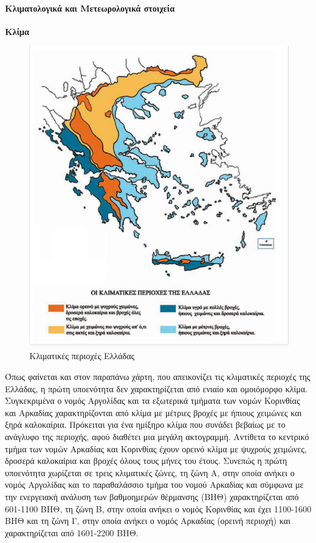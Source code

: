 \documentclass[12pt]{article}
\begin{document}
	\paragraph{Κλιματολογικά και Μετεωρολογικά στοιχεία}
	
	\textbf{Κλίμα}
	
	\begin{figure} [H]
		\begin{center}
			\includegraphics [scale = 0.70] {klima2.png}
			\caption{Κλιματικές περιοχές Ελλάδας}
			\label{klimatikes}
		\end{center}
	\end{figure}
	
	Όπως φαίνεται και στον παραπάνω χάρτη, που απεικονίζει τις κλιματικές περιοχές της Ελλάδας, η πρώτη υποενότητα δεν χαρακτηρίζεται από ενιαίο και ομοιόμορφο κλίμα. Συγκεκριμένα ο νομός Αργολίδας και τα εξωτερικά τμήματα των νομών Κορινθίας και Αρκαδίας χαρακτηρίζονται από κλίμα με μέτριες βροχές με ήπιους χειμώνες και ξηρά καλοκαίρια. Πρόκειται για ένα ημίξηρο κλίμα που συνάδει βεβαίως με το ανάγλυφο της περιοχής, αφού διαθέτει μια μεγάλη ακτογραμμή. Αντίθετα το κεντρικό τμήμα των νομών Αρκαδίας και Κορινθίας έχουν ορεινό κλίμα με ψυχρούς χειμώνες, δροσερά καλοκαίρια και βροχές όλους τους μήνες του έτους. Συνεπώς η πρώτη υποενότητα χωρίζεται σε τρεις κλιματικές ζώνες, τη ζώνη Α, στην οποία ανήκει ο νομός Αργολίδας και το παραθαλάσσιο τμήμα του νομού Αρκαδίας και σύμφωνα με την ενεργειακή ανάλυση των βαθμοημερών θέρμανσης (ΒΗΘ) χαρακτηρίζεται από 601-1100 ΒΗΘ, τη ζώνη Β, στην οποία ανήκει ο νομός Κορινθίας και έχει 1100-1600 ΒΗΘ και τη ζώνη Γ, στην οποία ανήκει ο νομός Αρκαδίας (ορεινή περιοχή) και χαρακτηρίζεται από 1601-2200 ΒΗΘ.
	
\end{document}

